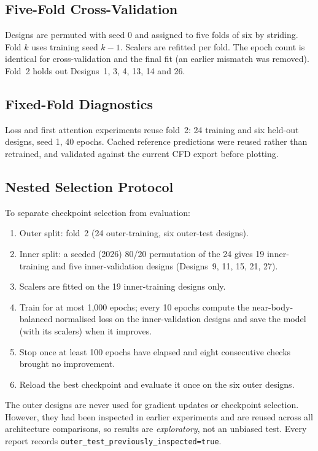 \documentclass[journal]{IEEEtran}
\begin{document}
\subsection{Five-Fold Cross-Validation}
Designs are permuted with seed 0 and assigned to five folds of six by striding.
Fold $k$ uses training seed $k-1$. Scalers are refitted per fold. The epoch
count is identical for cross-validation and the final fit (an earlier mismatch
was removed). Fold~2 holds out Designs~1, 3, 4, 13, 14 and 26.

\subsection{Fixed-Fold Diagnostics}
Loss and first attention experiments reuse fold~2: 24 training and six held-out
designs, seed 1, 40 epochs. Cached reference predictions were reused rather than
retrained, and validated against the current CFD export before plotting.

\subsection{Nested Selection Protocol}
\label{sec:nested}
To separate checkpoint selection from evaluation:
\begin{enumerate}
\item Outer split: fold~2 (24 outer-training, six outer-test designs).
\item Inner split: a seeded (2026) 80/20 permutation of the 24 gives 19
inner-training and five inner-validation designs
(Designs~9, 11, 15, 21, 27).
\item Scalers are fitted on the 19 inner-training designs only.
\item Train for at most 1{,}000 epochs; every 10 epochs compute the
near-body-balanced normalised loss on the inner-validation designs and save the
model (with its scalers) when it improves.
\item Stop once at least 100 epochs have elapsed and eight consecutive
checks brought no improvement.
\item Reload the best checkpoint and evaluate it once on the six outer designs.
\end{enumerate}
The outer designs are never used for gradient updates or checkpoint selection.
However, they had been inspected in earlier experiments and are reused across
all architecture comparisons, so results are \emph{exploratory}, not an unbiased
test. Every report records \texttt{outer\_test\_previously\_inspected=true}.
\end{document}

